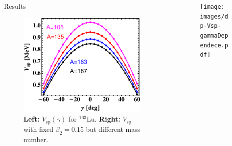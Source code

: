 \documentclass[final]{beamer}
\newlength{\sepwidth}
\newlength{\colwidth}
\newcommand{\separatorcolumn}{\begin{column}{\sepwidth}\end{column}}
\begin{document}
\begin{frame}[t]
\begin{columns}[t]
\begin{column}{\colwidth}
\begin{block}{Results}
\begin{figure}
\begin{minipage}{.5\textwidth}
  \centering
 \includegraphics[scale=1]{images/VSp_gammaBehavior-A.pdf}
\end{minipage}
     \caption{\textbf{Left:} $V_\text{sp}(\gamma)$ for $^{163}$Lu. \textbf{Right:} $V_\text{sp}$ with fixed $\beta_2=0.15$ but different mass number.}
     \label{vsp-behavior-gamma}
 \end{figure}
  \end{block}
  
  
\end{column}

\separatorcolumn

\begin{column}{\colwidth}
 \begin{figure}
     \centering
     \texttt{[image: images/dp-Vsp-gammaDependece.pdf]}
     

\end{figure}
\end{column}
\end{columns}
\end{frame}
\end{document}

